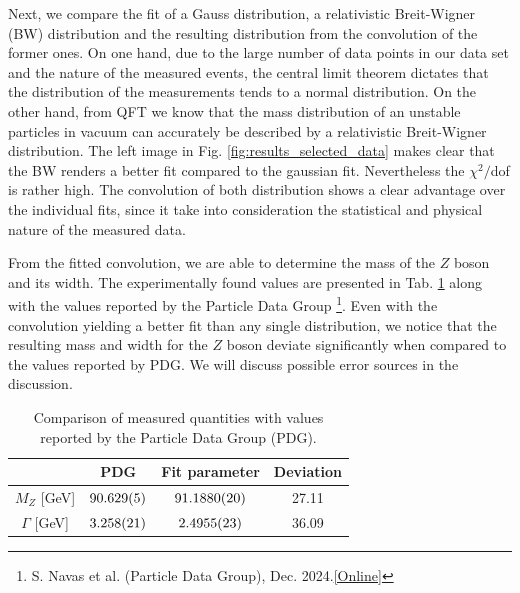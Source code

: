 \documentclass[11 pt]{article}
\begin{document}
Next, we compare the fit of a Gauss distribution, a relativistic Breit-Wigner (BW) distribution and the resulting distribution from the convolution of the former ones. On one hand, due to the large number of data points in our data set and the nature of the measured events, the central limit theorem dictates that the distribution of the measurements tends to a normal distribution. On the other hand, from QFT we know that the mass distribution of an unstable particles in vacuum can accurately be described by a relativistic Breit-Wigner distribution. The left image in Fig. \ref{fig:results_selected_data} makes clear that the BW renders a better fit compared to the gaussian fit. Nevertheless the $\chi^2/$dof is rather high. The convolution of both distribution shows a clear advantage over the individual fits, since it take into consideration the statistical and physical nature of the measured data. 

From the fitted convolution, we are able to determine the mass of the $Z$ boson and its width. The experimentally found values are presented in Tab. \ref{tab:results_literatur} along with the values reported by the Particle Data Group \footnote{S. Navas et al. (Particle Data Group), Dec. 2024.\href{https://pdglive.lbl.gov/Particle.action?node=S044&init=0}{[Online]}}. Even with the convolution yielding a better fit than any single distribution, we notice that the resulting mass and width for the $Z$ boson deviate significantly when compared to the values reported by PDG. We will discuss possible error sources in the discussion.

\begin{table}[!htbp]
 \begin{center}
  \caption{Comparison of measured quantities with values reported by the Particle Data Group (PDG).}
  \label{tab:results_literatur}
  \begin{tabular}{|c||c|c|c|}
  \hline
		  										& PDG 					& Fit parameter  & Deviation\\
		  										\hline
		  										\hline
  $M_Z$ [\unit{\giga\electronvolt}] & $\num{90.629\pm 0.005}$	& $\num{91.1880\pm 0.0020}$ & 27.11\\
  $\Gamma$ [\unit{\giga\electronvolt}]& $\num{3.258\pm 0.021}$ & $\num{2.4955\pm 0.0023}$&36.09\\
  \hline

\hline 
  \end{tabular}
 \end{center}
\end{table}
\end{document}
